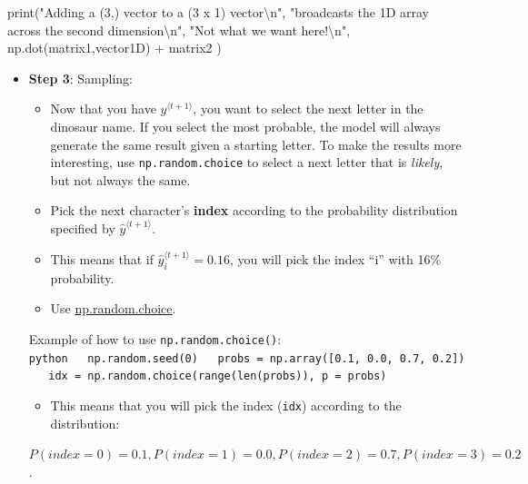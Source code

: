 \documentclass[11pt]{article}
\providecommand{\tightlist}{%
      \setlength{\itemsep}{0pt}\setlength{\parskip}{0pt}}
\newenvironment{Shaded}{}{}
\newcommand{\CharTok}[1]{\textcolor[rgb]{0.25,0.44,0.63}{{#1}}}
\newcommand{\StringTok}[1]{\textcolor[rgb]{0.25,0.44,0.63}{{#1}}}
\newcommand{\NormalTok}[1]{{#1}}
\newcommand{\OperatorTok}[1]{\textcolor[rgb]{0.40,0.40,0.40}{{#1}}}
\newcommand{\BuiltInTok}[1]{{#1}}
\begin{document}
\begin{Shaded}
\begin{Highlighting}[]
\BuiltInTok{print}\NormalTok{(}\StringTok{"Adding a (3,) vector to a (3 x 1) vector}\CharTok{\textbackslash{}n}\StringTok{"}\NormalTok{,}
      \StringTok{"broadcasts the 1D array across the second dimension}\CharTok{\textbackslash{}n}\StringTok{"}\NormalTok{,}
      \StringTok{"Not what we want here!}\CharTok{\textbackslash{}n}\StringTok{"}\NormalTok{,}
\NormalTok{      np.dot(matrix1,vector1D) }\OperatorTok{+}\NormalTok{ matrix2}
\NormalTok{     )}
\end{Highlighting}
\end{Shaded}

    \begin{itemize}
\item
  \textbf{Step 3}: Sampling:

  \begin{itemize}
  \tightlist
  \item
    Now that you have \(y^{\langle t+1 \rangle}\), you want to select
    the next letter in the dinosaur name. If you select the most
    probable, the model will always generate the same result given a
    starting letter. To make the results more interesting, use
    \texttt{np.random.choice} to select a next letter that is
    \emph{likely}, but not always the same.
  \item
    Pick the next character's \textbf{index} according to the
    probability distribution specified by
    \(\hat{y}^{\langle t+1 \rangle }\).
  \item
    This means that if \(\hat{y}^{\langle t+1 \rangle }_i = 0.16\), you
    will pick the index ``i'' with 16\% probability.
  \item
    Use
    \href{https://docs.scipy.org/doc/numpy-1.13.0/reference/generated/numpy.random.choice.html}{np.random.choice}.
  \end{itemize}

  Example of how to use \texttt{np.random.choice()}:
  \texttt{python\ \ \ np.random.seed(0)\ \ \ probs\ =\ np.array({[}0.1,\ 0.0,\ 0.7,\ 0.2{]})\ \ \ idx\ =\ np.random.choice(range(len(probs)),\ p\ =\ probs)}

  \begin{itemize}
  \tightlist
  \item
    This means that you will pick the index (\texttt{idx}) according to
    the distribution:
  \end{itemize}

  \(P(index = 0) = 0.1, P(index = 1) = 0.0, P(index = 2) = 0.7, P(index = 3) = 0.2\).


\end{itemize}
\end{document}
